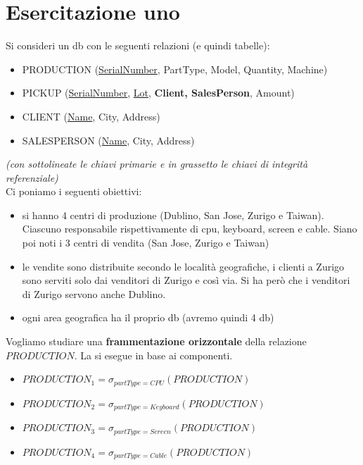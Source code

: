 \section{Esercitazione uno}
Si consideri un db con le seguenti relazioni (e quindi tabelle): 
\begin{itemize} 
    \item PRODUCTION (\underline{SerialNumber}, PartType, Model, Quantity, Machine) 
    \item PICKUP (\underline{SerialNumber}, \underline{Lot}, \textbf{Client, SalesPerson},  Amount) 
    \item CLIENT (\underline{Name}, City, Address) 
    \item SALESPERSON (\underline{Name}, City, Address) 
\end{itemize} \textit{(con sottolineate le chiavi primarie e in grassetto le chiavi di integrità referenziale)}\\
Ci poniamo i seguenti obiettivi:
\begin{itemize}
    \item si hanno 4 centri di produzione (Dublino, San Jose, Zurigo e Taiwan). Ciascuno responsabile rispettivamente di cpu, keyboard, screen e cable. Siano poi noti i 3 centri di vendita (San Jose, Zurigo  e Taiwan)
    \item le vendite sono distribuite secondo le località geografiche, i clienti a Zurigo sono serviti solo dai venditori di Zurigo e così via. Si ha però che i venditori di Zurigo servono anche Dublino.
    \item ogni area geografica ha il proprio db (avremo quindi 4 db)
\end{itemize}

Vogliamo studiare una \textbf{frammentazione orizzontale} della relazione $PRODUCTION$. La si esegue in base ai componenti. 
\begin{itemize}
    \item $PRODUCTION_1 = \sigma_{partType = CPU} (PRODUCTION)$
    \item $PRODUCTION_2 = \sigma_{partType = Keyboard} (PRODUCTION)$
    \item $PRODUCTION_3 = \sigma_{partType = Screen} (PRODUCTION)$
    \item $PRODUCTION_4 = \sigma_{partType = Cable} (PRODUCTION)$
\end{itemize}

